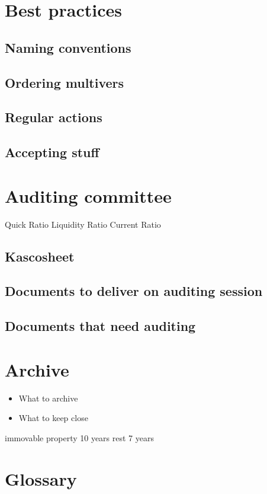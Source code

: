 \documentclass{report}
\begin{document}
\section{Best practices}
\subsection{Naming conventions}
\subsection{Ordering multivers}
\subsection{Regular actions}
\subsection{Accepting stuff}
\section{Auditing committee}
Quick Ratio
Liquidity Ratio
Current Ratio
\subsection{Kascosheet}
\subsection{Documents to deliver on auditing session}
\subsection{Documents that need auditing}
\section{Archive}
\begin{itemize}
	\item What to archive
	\item What to keep close
\end{itemize}
immovable property 10 years
rest 7 years
\section{Glossary}
\end{document}
